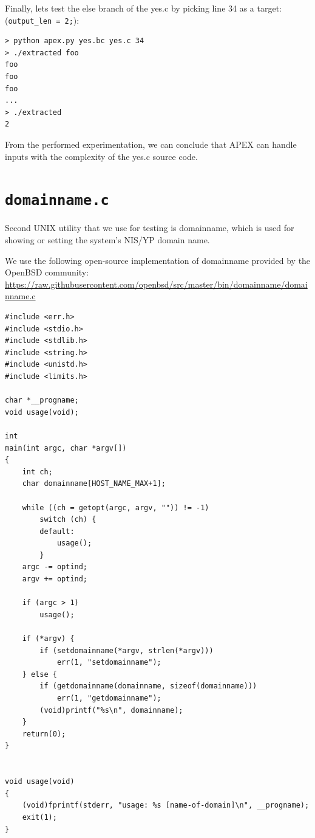 \documentclass[12pt, twoside]{fithesis2}
\renewcommand{\_}{\leavevmode \kern0.07em\vbox{\hrule width0.4em}}
\begin{document}
Finally, lets test the else branch of the yes.c by picking line 34 as a target:
(\texttt{output_len = 2;}):

\begin{verbatim}
> python apex.py yes.bc yes.c 34
> ./extracted foo
foo
foo
foo
...
> ./extracted
2
\end{verbatim}

From the performed experimentation, we can conclude that APEX can handle inputs
with the complexity of the yes.c source code.

\section{\texttt{domainname.c}}
\label{sec:exp_domainname}

Second UNIX utility that we use for testing is domainname, which is used
for showing or setting the system's NIS/YP domain name.

We use the following open-source implementation of domainname provided by the
OpenBSD community:
\url{https://raw.githubusercontent.com/openbsd/src/master/bin/domainname/domainname.c}


\begin{verbatim}
#include <err.h>
#include <stdio.h>
#include <stdlib.h>
#include <string.h>
#include <unistd.h>
#include <limits.h>

char *__progname;
void usage(void);

int
main(int argc, char *argv[])
{
    int ch;
    char domainname[HOST_NAME_MAX+1];

    while ((ch = getopt(argc, argv, "")) != -1)
        switch (ch) {
        default:
            usage();
        }
    argc -= optind;
    argv += optind;

    if (argc > 1)
        usage();

    if (*argv) {
        if (setdomainname(*argv, strlen(*argv)))
            err(1, "setdomainname");
    } else {
        if (getdomainname(domainname, sizeof(domainname)))
            err(1, "getdomainname");
        (void)printf("%s\n", domainname);
    }
    return(0);
}


void usage(void)
{
    (void)fprintf(stderr, "usage: %s [name-of-domain]\n", __progname);
    exit(1);
}
\end{verbatim}
\end{document}
